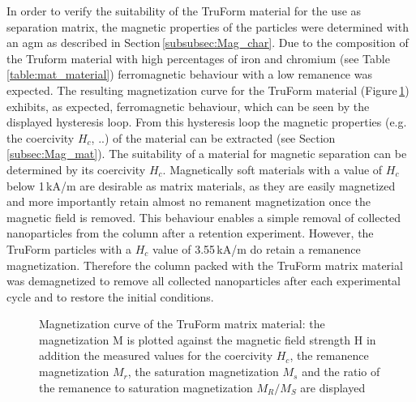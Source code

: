 In order to verify the suitability of the TruForm material for the use as separation matrix, the magnetic properties of the particles were determined with an \gls{agm} as described in Section\,\ref{subsubsec:Mag_char}. Due to the composition of the Truform material with high percentages of iron and chromium (see Table\,\ref{table:mat_material}) ferromagnetic behaviour with a low remanence was expected. The resulting magnetization curve for the TruForm material (Figure\,\ref{fig:Prax_hyst}) exhibits, as expected, ferromagnetic behaviour, which can be seen by the displayed hysteresis loop. From this hysteresis loop the magnetic properties (e.g. the coercivity $H_{c}$, ..) of the material can be extracted (see Section \ref{subsec:Mag_mat}). The suitability of a material for magnetic separation can be determined by its coercivity $H_{c}$. Magnetically soft materials with a value of $H_{c}$ below 1\,kA/m are desirable as matrix materials, as they are easily magnetized and more importantly retain almost no remanent magnetization once the magnetic field is removed. This behaviour enables a simple removal of collected nanoparticles from the column after a retention experiment. However, the TruForm particles with a $H_{c}$ value of 3.55\,kA/m do retain a remanence magnetization. Therefore the column packed with the TruForm matrix material was demagnetized to remove all collected nanoparticles after each experimental cycle and to restore the initial conditions. \FloatBarrier

\begin{figure}[h]
\centering

\caption[Magnetization curve of the TruForm matrix material]{Magnetization curve of the TruForm matrix material: the magnetization M is plotted against the magnetic field strength H in addition the measured values for the coercivity $H_{c}$, the remanence magnetization $M_{r}$, the saturation magnetization $M_{s}$ and the ratio of the remanence to saturation magnetization $M_{R}/M_{S}$ are displayed
\label{fig:Prax_hyst}
}
\end{figure}

